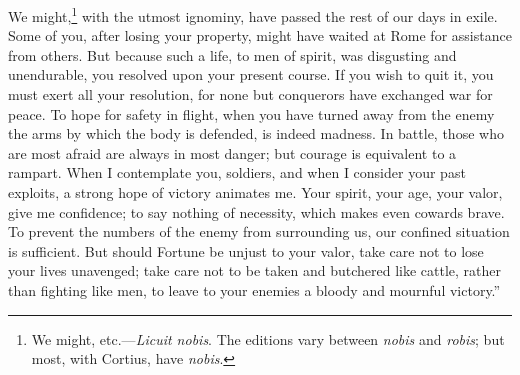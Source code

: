 We might,\footnote{We might, etc.—\emph{Licuit nobis}. The editions vary between
\emph{nobis} and \emph{robis}; but most, with Cortius, have \emph{nobis}.} with the utmost ignominy, have passed the rest of our
days in exile. Some of you, after losing your property, might have
waited at Rome for assistance from others. But because such a life, to
men of spirit, was disgusting and unendurable, you resolved upon your
present course. If you wish to quit it, you must exert all your
resolution, for none but conquerors have exchanged war for peace. To
hope for safety in flight, when you have turned away from the enemy
the arms by which the body is defended, is indeed madness. In battle,
those who are most afraid are always in most danger; but courage is
equivalent to a rampart. When I contemplate you, soldiers, and when I
consider your past exploits, a strong hope of victory animates me.
Your spirit, your age, your valor, give me confidence; to say nothing
of necessity, which makes even cowards brave. To prevent the numbers
of the enemy from surrounding us, our confined situation is
sufficient. But should Fortune be unjust to your valor, take care not
to lose your lives unavenged; take care not to be taken and butchered
like cattle, rather than fighting like men, to leave to your enemies a
bloody and mournful victory.''

